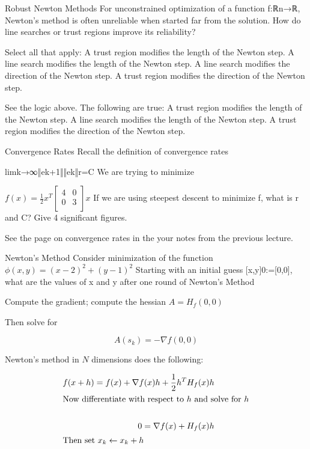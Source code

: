 \documentclass[../main.tex]{subfiles}
\begin{document}
Robust Newton Methods
For unconstrained optimization of a function f:ℝn→ℝ, Newton's method is often unreliable when started far from the solution. How do line searches or trust regions improve its reliability?

Select all that apply:
A trust region modifies the length of the Newton step.
A line search modifies the length of the Newton step.
A line search modifies the direction of the Newton step.
A trust region modifies the direction of the Newton step.

\begin{solution}
    See the logic above. The following are true:
A trust region modifies the length of the Newton step.
A line search modifies the length of the Newton step.
A trust region modifies the direction of the Newton step.
\end{solution}

Convergence Rates
Recall the definition of convergence rates

limk→∞‖ek+1‖‖ek‖r=C
We are trying to minimize

$f(x)=\frac{1}{2} x^T \begin{bmatrix}
    4 & 0 \\
    0 & 3 \\
\end{bmatrix}x$
If we are using steepest descent to minimize f, what is r and C? Give 4 significant figures.

\begin{solution}
    See the page on convergence rates in the your notes from the previous lecture.
\end{solution}


Newton's Method
Consider minimization of the function
$ϕ(x,y)=(x−2)^2+(y−1)^2$
Starting with an initial guess [x,y]0:=[0,0], what are the values of x and y after one round of Newton's Method

\begin{solution}
    Compute the gradient; compute the hessian $A = H_f(0,0)$

    Then solve for

    \[
        A(s_k) = - \nabla f(0,0)
    \]
\end{solution}

\begin{definition}
    Newton's method in $N$ dimensions does the following:

    \begin{align*}
        f(x + h) = f(x) + \nabla f(x) h + \frac{1}{2} h^T H_{f}(x) h \\
        \intertext{Now differentiate with respect to $h$ and solve for $h$} \\
        0 =  \nabla f(x) + H_{f}(x) h \\
        \intertext{Then set $x_k \leftarrow x_k + h$ } \\
    \end{align*}
\end{definition}
\end{document}
